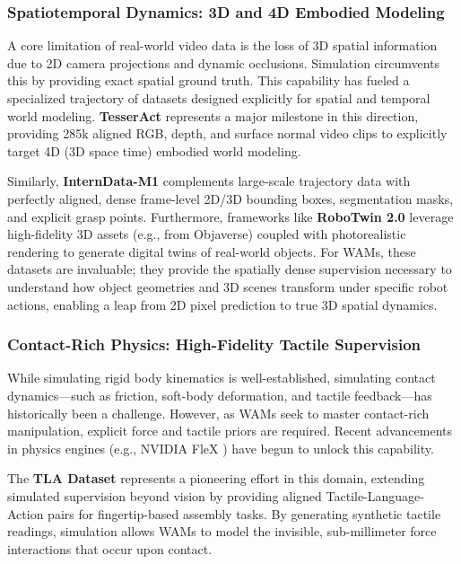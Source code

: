 \subsubsection{Spatiotemporal Dynamics: 3D and 4D Embodied Modeling} 
A core limitation of real-world video data is the loss of 3D spatial information due to 2D camera projections and dynamic occlusions. Simulation circumvents this by providing exact spatial ground truth. This capability has fueled a specialized trajectory of datasets designed explicitly for spatial and temporal world modeling. \textbf{TesserAct} \cite{TesserAct1} represents a major milestone in this direction, providing 285k aligned RGB, depth, and surface normal video clips to explicitly target 4D (3D space \text{+} time) embodied world modeling.

Similarly, \textbf{InternData-M1} \cite{InternVLA-M1} complements large-scale trajectory data with perfectly aligned, dense frame-level 2D/3D bounding boxes, segmentation masks, and explicit grasp points. Furthermore, frameworks like \textbf{RoboTwin 2.0} \cite{RoboTWIN_2} leverage high-fidelity 3D assets (e.g., from Objaverse) coupled with photorealistic rendering to generate digital twins of real-world objects. For WAMs, these datasets are invaluable; they provide the spatially dense supervision necessary to understand how object geometries and 3D scenes transform under specific robot actions, enabling a leap from 2D pixel prediction to true 3D spatial dynamics.

\subsubsection{Contact-Rich Physics: High-Fidelity Tactile Supervision} 
While simulating rigid body kinematics is well-established, simulating contact dynamics—such as friction, soft-body deformation, and tactile feedback—has historically been a challenge. However, as WAMs seek to master contact-rich manipulation, explicit force and tactile priors are required. Recent advancements in physics engines (e.g., NVIDIA FleX \cite{FleX}) have begun to unlock this capability. 

The \textbf{TLA Dataset} \cite{TLA} represents a pioneering effort in this domain, extending simulated supervision beyond vision by providing aligned Tactile-Language-Action pairs for fingertip-based assembly tasks. By generating synthetic tactile readings, simulation allows WAMs to model the invisible, sub-millimeter force interactions that occur upon contact. 

